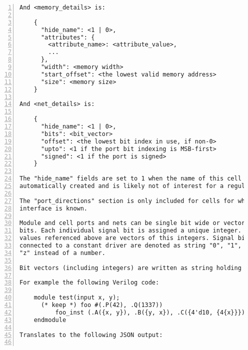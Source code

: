 \begin{lstlisting}[numbers=left,frame=single]
And <memory_details> is:

    {
      "hide_name": <1 | 0>,
      "attributes": {
        <attribute_name>: <attribute_value>,
        ...
      },
      "width": <memory width>
      "start_offset": <the lowest valid memory address>
      "size": <memory size>
    }

And <net_details> is:

    {
      "hide_name": <1 | 0>,
      "bits": <bit_vector>
      "offset": <the lowest bit index in use, if non-0>
      "upto": <1 if the port bit indexing is MSB-first>
      "signed": <1 if the port is signed>
    }

The "hide_name" fields are set to 1 when the name of this cell or net is
automatically created and is likely not of interest for a regular user.

The "port_directions" section is only included for cells for which the
interface is known.

Module and cell ports and nets can be single bit wide or vectors of multiple
bits. Each individual signal bit is assigned a unique integer. The <bit_vector>
values referenced above are vectors of this integers. Signal bits that are
connected to a constant driver are denoted as string "0", "1", "x", or
"z" instead of a number.

Bit vectors (including integers) are written as string holding the binaryrepresentation of the value. Strings are written as strings, with an appendedblank in cases of strings of the form /[01xz]* */.

For example the following Verilog code:

    module test(input x, y);
      (* keep *) foo #(.P(42), .Q(1337))
          foo_inst (.A({x, y}), .B({y, x}), .C({4'd10, {4{x}}}));
    endmodule

Translates to the following JSON output:


\end{lstlisting}
